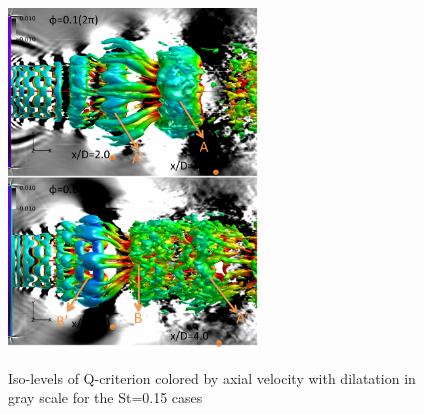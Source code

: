 \documentclass[english]{aiaa-tc}
\begin{document}
\begin{figure}
\begin{center}
\begin{centering}
{\includegraphics[width=2.6in]{M09St015qcritphase0106AB}}
\end{centering}
\caption{Iso-levels of Q-criterion colored by axial velocity with dilatation in gray scale for the St=0.15 cases}
\label{fig:isolevels15}
\end{center}
\end{figure}
\end{document}
